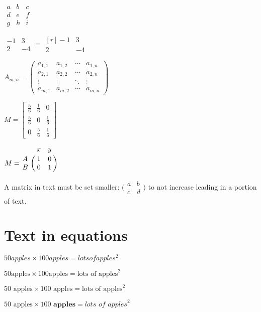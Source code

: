 \documentclass{article}
\begin{document}
$\begin{matrix}
a & b & c \\
d & e & f \\
g & h & i
\end{matrix}$

$\begin{matrix}
-1 & 3 \\
2 & -4
\end{matrix}
=
\begin{matrix}[r]
-1 & 3 \\
2 & -4
\end{matrix}$

 
 
 
$A_{m,n} =
\begin{pmatrix}
a_{1,1} & a_{1,2} & \cdots & a_{1,n} \\
a_{2,1} & a_{2,2} & \cdots & a_{2,n} \\
\vdots  & \vdots  & \ddots & \vdots  \\
a_{m,1} & a_{m,2} & \cdots & a_{m,n}
\end{pmatrix}$

$
M = \begin{bmatrix}
       \frac{5}{6} & \frac{1}{6} & 0           \\[0.3em]
       \frac{5}{6} & 0           & \frac{1}{6} \\[0.3em]
       0           & \frac{5}{6} & \frac{1}{6}
     \end{bmatrix}$

$M = \bordermatrix{~ & x & y \cr
                  A & 1 & 0 \cr
                  B & 0 & 1 \cr}$



A matrix in text must be set smaller:
$\bigl(\begin{smallmatrix}
a&b\\ c&d
\end{smallmatrix} \bigr)$
to not increase leading in a portion of text.


\section{Text in equations}

$50 apples \times 100 apples = lots of apples^2$

$50 \text{apples} \times 100 \text{apples}
 = \text{lots of apples}^2$

$50 \text{ apples} \times 100 \text{ apples}
 = \text{lots of apples}^2$

$50 \textrm{ apples} \times 100
 \textbf{ apples} = \textit{lots of apples}^2$
\end{document}
